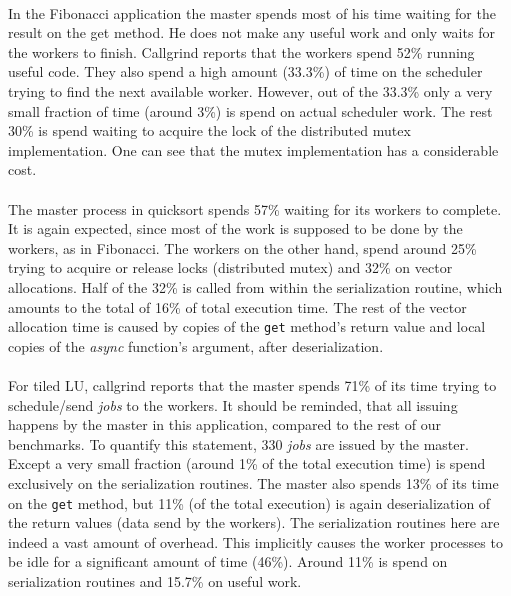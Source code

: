\paragraph{}
In the Fibonacci application the master spends most of his time waiting for the result on the 
get method.  He does not make any useful work and only waits for the workers to finish.  Callgrind reports that the
workers spend 52\% running useful code.  They also spend a high amount (33.3\%) of time on the scheduler trying to 
find the next available worker.  However, out of the 33.3\% only a very small fraction of time (around 3\%) is spend
on actual scheduler work.  The rest 30\% is spend waiting to acquire the lock of the distributed mutex implementation.
One can see that the mutex implementation has a considerable cost.   

\paragraph{}
The master process in quicksort spends 57\% waiting for its workers to complete.  It is again expected, since
most of the work is supposed to be done by the workers, as in Fibonacci.   The workers on the other hand, spend
around 25\% trying to acquire or release locks (distributed mutex) and 32\% on vector allocations.  Half of the
32\% is called from within the serialization routine, which amounts to the total of 16\% of total execution time.
The rest of the vector allocation time is caused by copies of the \texttt{get} method's return value and local
copies of the \emph{async} function's argument, after deserialization.

\paragraph{}
For tiled LU, callgrind reports that the master spends 71\% of its time trying to schedule/send \emph{jobs} to the
workers.  It should be reminded, that all issuing happens by the master in this application, compared to the rest
of our benchmarks.  To quantify this statement, 330 \emph{jobs} are issued by the master.  Except a very small fraction
(around 1\% of the total execution time) is spend exclusively on the serialization routines.  
The master also spends 13\% of its time on the 
\texttt{get} method, but 11\% (of the total execution) is again deserialization of the return values (data send by the workers).
The serialization routines here are indeed a vast amount of overhead.  This implicitly causes the worker processes to
be idle for a significant amount of time (46\%).  Around 11\% is spend on serialization routines and 15.7\% on useful
work.

